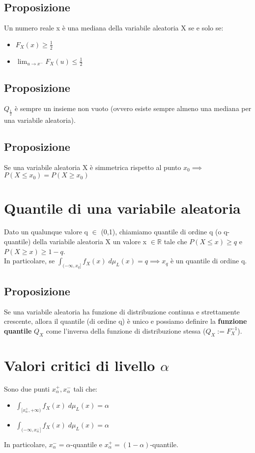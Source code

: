 \documentclass{article}
\begin{document}
\subsection*{Proposizione}
Un numero reale x è una mediana della variabile aleatoria X se e solo se:
\begin{itemize}
\item $F_{X}(x) \geq \frac{1}{2}$
\item $\lim_{u\to x^{-}}F_{X}(u) \leq \frac{1}{2}$
\end{itemize}

\subsection*{Proposizione}
$Q_{\frac{1}{2}}$ è sempre un insieme non vuoto (ovvero esiste sempre almeno una mediana per una variabile aleatoria).

\subsection*{Proposizione}
Se una variabile aleatoria X è simmetrica rispetto al punto $x_{0} \implies$\\
$P(X \leq x_{0}) = P(X \geq x_{0})$

\section*{Quantile di una variabile aleatoria}
Dato un qualunque valore q $\in$ (0,1), chiamiamo quantile di ordine q (o q-quantile) della variabile aleatoria X un valore x $\in \mathbb{R}$ tale che $P(X \leq x) \geq q$ e $P(X \geq x) \geq 1-q$.\\
In particolare, se $\int_{(-\infty, x_{q}]}^{}f_{X}(x) \; d\mu_{L}(x) = q \implies x_{q}$ è un quantile di ordine q.

\subsection*{Proposizione}
Se una variabile aleatoria ha funzione di distribuzione continua e strettamente crescente, allora il quantile (di ordine q) è unico e possiamo definire la \textbf{funzione quantile} $Q_{X}$ come l'inversa della funzione di distribuzione stessa ($Q_{X} := F_{X}^{-1}$).

\section*{Valori critici di livello $\alpha$}
Sono due punti $x_{\alpha}^{+}, x_{\alpha}^{-}$ tali che:
\begin{itemize}
\item $\int_{[x_{\alpha}^{+}, +\infty)}^{}f_{X}(x) \; d\mu_{L}(x) = \alpha$
\item $\int_{(-\infty, x_{\alpha}^{-}]}^{}f_{X}(x) \; d\mu_{L}(x) = \alpha$
\end{itemize}
In particolare, $x_{\alpha}^{-} = \alpha$-quantile e $x_{\alpha}^{+} = (1-\alpha)$-quantile.
\end{document}
